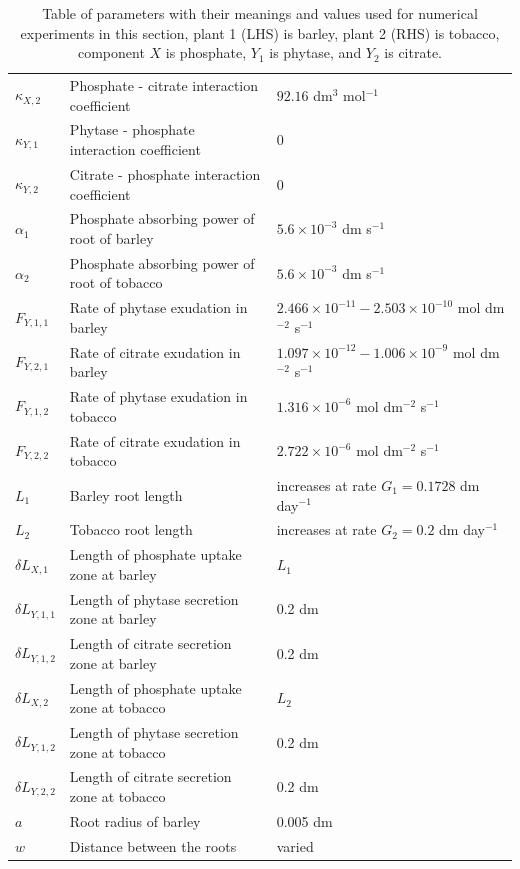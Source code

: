 \documentclass[11pt]{article}
\numberwithin{equation}{section}
\begin{document}
\begin{table}[!htb]
\begin{center}
\begin{tabular}{lll}
	$\kappa_{X,2}$ & Phosphate - citrate interaction coefficient & $92.16$ dm$^3$ mol$^{-1}$ \\
	$\kappa_{Y,1}$ & Phytase - phosphate interaction coefficient & 0 \\
	$\kappa_{Y,2}$ & Citrate - phosphate interaction coefficient & 0 \\ 
	$\alpha_1 $ & Phosphate absorbing power of root of barley & $5.6 \times 10^{-3}$ dm s$^{-1}$\\
	$\alpha_2 $ & Phosphate absorbing power of root of tobacco & $5.6 \times 10^{-3}$ dm s$^{-1}$\\
	$F_{Y,1,1} $ & Rate of phytase exudation in barley & $2.466 \times 10^{-11} - 2.503 \times 10^{-10}$  mol dm$^{-2}$ s$^{-1}$ \\
	$F_{Y,2,1} $ & Rate of citrate exudation in barley & $1.097 \times 10^{-12} - 1.006 \times 10^{-9}$ mol dm$^{-2}$ s$^{-1}$ \\
	$F_{Y,1,2} $ & Rate of phytase exudation in tobacco &  $1.316 \times 10^{-6}$ mol dm$^{-2}$ s$^{-1}$ \\
	$F_{Y,2,2} $ & Rate of citrate exudation in tobacco &  $2.722 \times 10^{-6}$ mol dm$^{-2}$ s$^{-1}$ \\
	$L_1$ & Barley root length & increases at rate $G_1 = 0.1728$ dm day$^{-1}$ \\
	$L_2$ & Tobacco root length & increases at rate $G_2 = 0.2$ dm day$^{-1}$\\
	$\delta L_{X,1}$ & Length of phosphate uptake zone at barley & $L_1$\\
	$\delta L_{Y,1,1}$ & Length of phytase secretion zone at barley & 0.2 dm \\
	$\delta L_{Y,1,2}$ & Length of citrate secretion zone at barley & 0.2 dm\\
	$\delta L_{X,2}$ & Length of phosphate uptake zone at tobacco & $L_2$ \\
	$\delta L_{Y,1,2}$ &  Length of phytase secretion zone at tobacco & 0.2 dm \\
	$\delta L_{Y,2,2}$ &  Length of citrate secretion zone at tobacco & 0.2 dm \\
	$a$ & Root radius of barley & 0.005 dm \\
	$w$ & Distance between the roots & varied \\
\bottomrule

\end{tabular}
\caption{Table of parameters with their meanings and values used for numerical experiments in this section, plant 1 (LHS) is barley, plant 2 (RHS) is tobacco, component $X$ is phosphate, $Y_1$ is phytase, and $Y_2$ is citrate. \label{t:Second-model-params}
}
\end{center}

\end{table}
\end{document}
